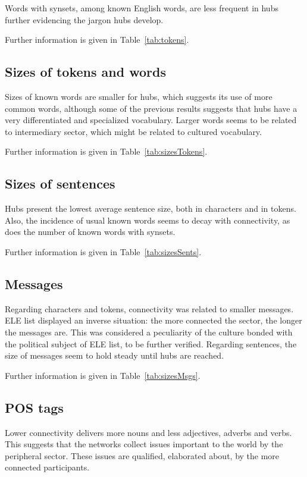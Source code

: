 \documentclass[%
 aip,
 jmp,%
 amsmath,amssymb,
 reprint,%
]{revtex4-1}
\begin{document}
Words with synsets, among known English words, are less frequent in hubs further evidencing the jargon hubs develop.

Further information is given in Table~\ref{tab:tokens}.

\subsection{Sizes of tokens and words}\label{subsec:tw2}
Sizes of known words are smaller for hubs, which suggests its use of more common words, although some of the previous results suggests that hubs have a very differentiated and specialized vocabulary. Larger words seems to be related to intermediary sector, which might be related to cultured vocabulary.

Further information is given in Table~\ref{tab:sizesTokens}.

\subsection{Sizes of sentences}\label{subsec:ss}
Hubs present the lowest average sentence size, both in characters and in tokens. Also, the incidence of usual known words seems to decay with connectivity, as does the number of known words with synsets.

Further information is given in Table~\ref{tab:sizesSents}.

\subsection{Messages}\label{subsec:mm}
Regarding characters and tokens, connectivity was related to smaller messages. ELE list displayed an inverse situation: the more connected the sector, the longer the messages are. This was considered a peculiarity of the culture bonded with the political subject of ELE list, to be further verified. Regarding sentences, the size of messages seem to hold steady until hubs are reached.

Further information is given in Table~\ref{tab:sizesMsgs}.

\subsection{POS tags}\label{subsec:pos}
Lower connectivity delivers more nouns and less adjectives, adverbs and verbs. This suggests that the networks collect issues important to the world by the peripheral sector. These issues are qualified, elaborated about, by the more connected participants.
\end{document}
